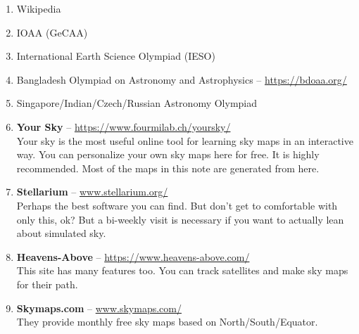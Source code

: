 \documentclass[a4paper,12pt]{extarticle}
\begin{document}
\begin{enumerate}
    \item Wikipedia
    \item  IOAA (GeCAA)
    \item International Earth Science Olympiad (IESO)
    \item Bangladesh Olympiad on Astronomy and Astrophysics -- \url{https://bdoaa.org/}
    \item Singapore/Indian/Czech/Russian Astronomy Olympiad 
    \item \textbf{Your Sky} -- \url{https://www.fourmilab.ch/yoursky/}\\
Your sky is the most useful online tool for learning sky maps in an interactive way. You can personalize your own sky maps here for free. It is highly recommended. Most of the maps in this note are generated from here.
\item \textbf{Stellarium} -- \url{www.stellarium.org/}\\
Perhaps the best software you can find. But don’t get to comfortable with only this, ok? But a bi-weekly visit is necessary if you want to actually lean about simulated sky.
\item \textbf{Heavens-Above} -- \url{https://www.heavens-above.com/}\\
This site has many features too. You can track satellites and make sky maps for their path.
\item \textbf{Skymaps.com} -- \url{www.skymaps.com/}\\
They provide monthly free sky maps based on North/South/Equator.
\end{enumerate}
\end{document}
